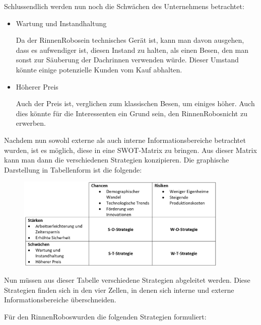         \noindent Schlussendlich werden nun noch die Schwächen des Unternehmens betrachtet:
        
            \begin{itemize}
                \item Wartung und Instandhaltung
        
                    Da der \as RinnenRobos\adl ein technisches Gerät ist, kann man davon ausgehen, dass es aufwendiger ist,
                    diesen Instand zu halten, als einen Besen, den man sonst zur Säuberung der Dachrinnen verwenden würde.
                    Dieser Umstand könnte einige potenzielle Kunden vom Kauf abhalten.
                \item Höherer Preis
                
                    Auch der Preis ist, verglichen zum klassischen Besen, um einiges höher. Auch dies könnte für die
                    Interessenten ein Grund sein, den \as RinnenRobos\adl nicht zu erwerben.
            \end{itemize}
        
        \noindent Nachdem nun sowohl externe als auch interne Informationsbereiche betrachtet wurden, ist es möglich, diese in
        eine SWOT-Matrix zu bringen. Aus dieser Matrix kann man dann die verschiedenen Strategien konzipieren. Die graphische
        Darstellung in Tabellenform ist die folgende:
        
            \begin{figure}[ht]
                \centering
                \includegraphics[width = 0.9\textwidth]{Eigene Darstellungen/SWOT Tabelle.jpg}
            \end{figure}
        
        \noindent Nun müssen aus dieser Tabelle verschiedene Strategien abgeleitet werden. Diese Strategien finden sich in den
        vier Zellen, in denen sich interne und externe Informationsbereiche überschneiden.
        
        \noindent Für den \as RinnenRobos\adl wurden die folgenden Strategien formuliert:
        
